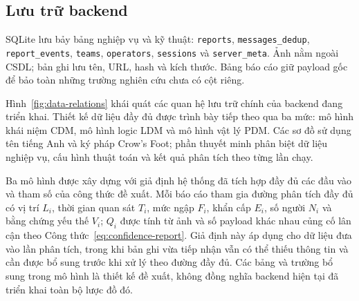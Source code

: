 \subsection{Lưu trữ backend}
SQLite lưu bảy bảng nghiệp vụ và kỹ thuật: \texttt{reports}, \texttt{messages\_dedup}, \texttt{report\_events}, \texttt{teams}, \texttt{operators}, \texttt{sessions} và \texttt{server\_meta}. Ảnh nằm ngoài CSDL; bản ghi lưu tên, URL, hash và kích thước. Bảng báo cáo giữ payload gốc để bảo toàn những trường nghiên cứu chưa có cột riêng.

Hình~\ref{fig:data-relations} khái quát các quan hệ lưu trữ chính của backend đang triển khai. Thiết kế dữ liệu đầy đủ được trình bày tiếp theo qua ba mức: mô hình khái niệm CDM, mô hình logic LDM và mô hình vật lý PDM. Các sơ đồ sử dụng tên tiếng Anh và ký pháp Crow's Foot; phần thuyết minh phân biệt dữ liệu nghiệp vụ, cấu hình thuật toán và kết quả phân tích theo từng lần chạy.

Ba mô hình được xây dựng với giả định hệ thống đã tích hợp đầy đủ các đầu vào và tham số của công thức đề xuất. Mỗi báo cáo tham gia đường phân tích đầy đủ có vị trí $L_i$, thời gian quan sát $T_i$, mức ngập $F_i$, khẩn cấp $E_i$, số người $N_i$ và bằng chứng yếu thế $V_i$; $Q_i$ được tính từ ảnh và số payload khác nhau củng cố lân cận theo Công thức~\ref{eq:confidence-report}. Giả định này áp dụng cho dữ liệu đưa vào lần phân tích, trong khi bản ghi vừa tiếp nhận vẫn có thể thiếu thông tin và cần được bổ sung trước khi xử lý theo đường đầy đủ. Các bảng và trường bổ sung trong mô hình là thiết kế đề xuất, không đồng nghĩa backend hiện tại đã triển khai toàn bộ lược đồ đó.


